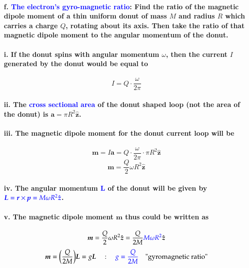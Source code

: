\documentclass{article}
\begin{document}
\paragraph{\indent f. \textcolor{blue}{The electron's gyro-magnetic ratio}: Find the ratio of the magnetic dipole moment of a thin uniform donut of mass $M$ and radius $R$ which carries a charge $Q$, rotating about its axis. Then take the ratio of that magnetic dipole moment to the angular momentum of the donut.}
\paragraph{\indent\indent i. If the donut spins with angular momentum $\omega$, then the current $I$ generated by the donut would be equal to}
\begin{equation*}
    I=Q\cdot\frac{\omega}{2\pi}
\end{equation*}
\paragraph{\indent\indent ii. The \textcolor{blue}{cross sectional area} of the donut shaped loop (not the area of the donut) is $\boldsymbol{a}=\pi R^2\hat{\boldsymbol{z}}$.}
\paragraph{\indent\indent iii. The magnetic dipole moment for the donut current loop will be}
\begin{equation*}
    \boldsymbol{m}=I\boldsymbol{a}=Q\cdot\frac{\omega}{2\pi}\cdot\pi R^2\hat{\boldsymbol{z}}
\end{equation*}
\begin{equation*}
    \boldsymbol{m}=\frac{Q}{2}\omega R^2\hat{\boldsymbol{z}}
\end{equation*}
\paragraph{\indent\indent iv. The angular momentum \textcolor{blue}{L} of the donut will be given by $\textcolor{blue}{\boldsymbol{L}=\boldsymbol{r}\times\boldsymbol{p}=M\omega R^2\hat{\boldsymbol{z}}}$.}
\paragraph{\indent\indent v. The magnetic dipole moment $\boldsymbol{m}$ thus could be written as}
\begin{equation*}
    \boldsymbol{m}=\frac{Q}{2}\omega R^2\hat{\boldsymbol{z}}=\frac{Q}{2M}\textcolor{blue}{M\omega R^2}\hat{\boldsymbol{z}}
\end{equation*}
\begin{equation*}
\boldsymbol{m}=\bigg(\frac{Q}{2M}\bigg)\boldsymbol{L}=g\boldsymbol{L}\quad:\quad\textcolor{blue}{g=\frac{Q}{2M}}\quad\text{"gyromagnetic ratio"}
\end{equation*}
\end{document}
